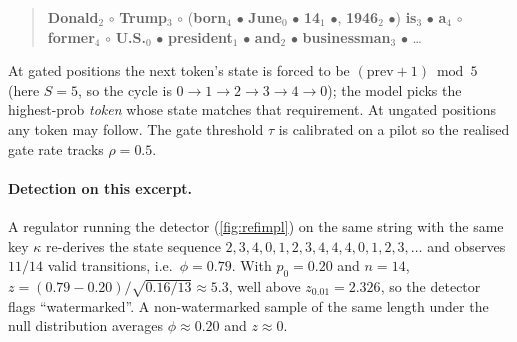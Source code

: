 \begin{quote}\small\ttfamily
\textbf{Donald}$_2$ $\circ$ \textbf{Trump}$_3$ $\circ$
(\textbf{born}$_4$ $\bullet$ \textbf{June}$_0$ $\bullet$
\textbf{14}$_1$ $\bullet$, \textbf{1946}$_2$ $\bullet$)
\textbf{is}$_3$ $\bullet$ \textbf{a}$_4$ $\circ$ \textbf{former}$_4$
$\circ$ \textbf{U.S.}$_0$ $\bullet$ \textbf{president}$_1$
$\bullet$ \textbf{and}$_2$ $\bullet$ \textbf{businessman}$_3$
$\bullet$ \dots
\end{quote}

At gated positions the next token's state is forced to be
$(\text{prev}+1)\bmod 5$ (here $S{=}5$, so the cycle is
$0{\to}1{\to}2{\to}3{\to}4{\to}0$); the model picks the highest-prob
\emph{token} whose state matches that requirement. At ungated
positions any token may follow. The gate threshold $\tau$ is
calibrated on a pilot so the realised gate rate tracks $\rho{=}0.5$.

\paragraph{Detection on this excerpt.}
A regulator running the detector
(\autoref{fig:refimpl}) on the same string with the same key $\kappa$
re-derives the state sequence
$2,3,4,0,1,2,3,4,4,4,0,1,2,3,\dots$ and
observes $11/14$ valid transitions, i.e.\ $\phi=0.79$. With
$p_0{=}0.20$ and $n{=}14$, $z = (0.79-0.20)/\sqrt{0.16/13} \approx
5.3$, well above $z_{0.01}=2.326$, so the detector flags
``watermarked''. A non-watermarked sample of the same length under
the null distribution averages $\phi\approx 0.20$ and $z\approx 0$.
